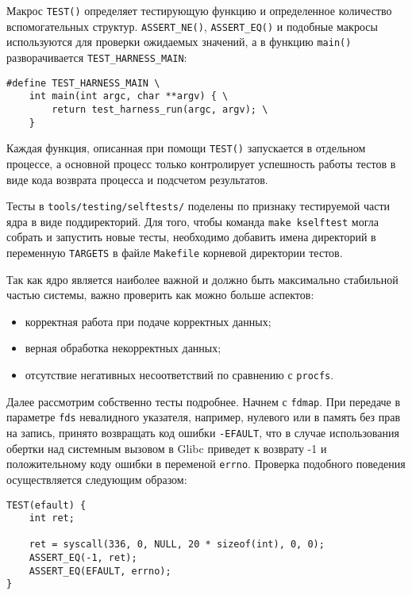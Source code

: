 Макрос \texttt{TEST()} определяет тестирующую функцию и определенное количество
вспомогательных структур. \texttt{ASSERT\_NE()}, \texttt{ASSERT\_EQ()} и
подобные макросы используются для проверки ожидаемых значений, а в функцию
\texttt{main()} разворачивается \texttt{TEST\_HARNESS\_MAIN}:
\medskip
\begin{lstlisting}[style=cstyle]
#define TEST_HARNESS_MAIN \
	int main(int argc, char **argv) { \
		return test_harness_run(argc, argv); \
	}
\end{lstlisting}
\medskip

Каждая функция, описанная при помощи \texttt{TEST()} запускается в отдельном
процессе, а основной процесс только контролирует успешность работы тестов в виде
кода возврата процесса и подсчетом результатов.

Тесты в \texttt{tools/testing/selftests/} поделены по признаку тестируемой части
ядра в виде поддиректорий. Для того, чтобы команда \texttt{make kselftest} могла
собрать и запустить новые тесты, необходимо добавить имена директорий в
переменную \texttt{TARGETS} в файле \texttt{Makefile} корневой директории тестов.

Так как ядро является наиболее важной и должно быть максимально стабильной частью
системы, важно проверить как можно больше аспектов:
\begin{itemize}
\item корректная работа при подаче корректных данных;
\item верная обработка некорректных данных;
\item отсутствие негативных несоответствий по сравнению с \texttt{procfs}.
\end{itemize}

Далее рассмотрим собственно тесты подробнее. Начнем с
\texttt{fdmap}. При передаче в параметре \texttt{fds} невалидного
указателя, например, нулевого или в память без прав на запись, принято
возвращать код ошибки \texttt{-EFAULT}, что в случае использования обертки над
системным вызовом в Glibc приведет к возврату -1 и положительному коду ошибки в
переменой \texttt{errno}. Проверка подобного поведения осуществляется следующим
образом:
\medskip
\begin{lstlisting}[style=cstyle]
TEST(efault) {
	int ret;

	ret = syscall(336, 0, NULL, 20 * sizeof(int), 0, 0);
	ASSERT_EQ(-1, ret);
	ASSERT_EQ(EFAULT, errno);
}
\end{lstlisting}
\medskip

